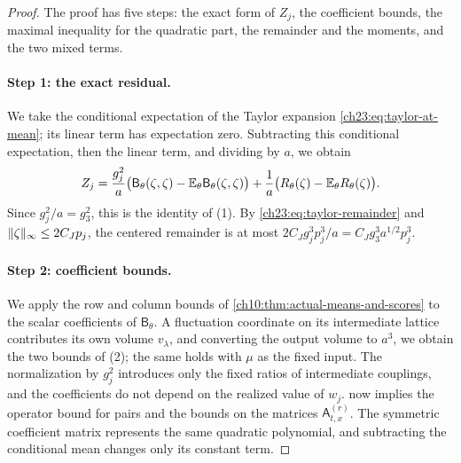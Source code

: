 \begin{proof}
The proof has five steps: the exact form of $Z_j$, the coefficient bounds, the maximal inequality for the quadratic part, the remainder and the moments, and the two mixed terms.

\paragraph{Step 1: the exact residual.}
We take the conditional expectation of the Taylor expansion \eqref{ch23:eq:taylor-at-mean}; its linear term has expectation zero. Subtracting this conditional expectation, then the linear term, and dividing by $a$, we obtain
\[
 Z_j=\frac{g_j^2}{a}\bigl(\mathsf B_\theta(\zeta,\zeta)-\mathbb E_\theta\mathsf B_\theta(\zeta,\zeta)\bigr)+\frac1a\bigl(R_\theta(\zeta)-\mathbb E_\theta R_\theta(\zeta)\bigr).
\]
Since $g_j^2/a=g_3^2$, this is the identity of (1). By \eqref{ch23:eq:taylor-remainder} and $\lVert \zeta\rVert_\infty\le2C_Jp_j$, the centered remainder is at most $2C_Jg_j^3p_j^3/a=C_Jg_3^3a^{1/2}p_j^3$.

\paragraph{Step 2: coefficient bounds.}
We apply the row and column bounds of \cref{ch10:thm:actual-means-and-scores} to the scalar coefficients of $\mathsf B_\theta$. A fluctuation coordinate on its intermediate lattice contributes its own volume $v_\lambda$, and converting the output volume to $a^3$, we obtain the two bounds of (2); the same holds with $\mu$ as the fixed input. The normalization by $g_j^2$ introduces only the fixed ratios of intermediate couplings, and the coefficients do not depend on the realized value of $w_j$.  now implies the operator bound for pairs and the bounds on the matrices $\mathsf A_{t,x}^{(r)}$. The symmetric coefficient matrix represents the same quadratic polynomial, and subtracting the conditional mean changes only its constant term.


\end{proof}
